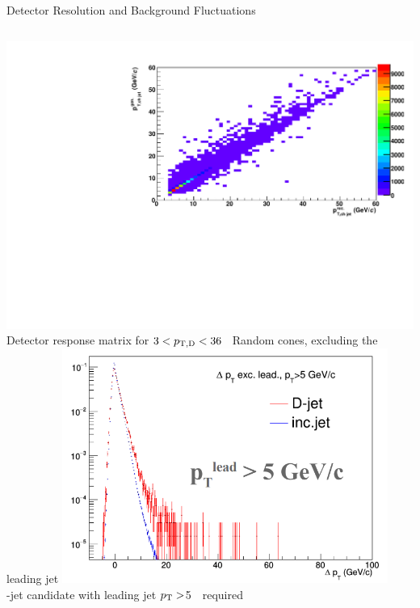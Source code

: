 \documentclass[xcolor={usenames,dvipsnames}, aspectratio=169]{beamer}
\begin{document}
\begin{frame}{Detector Resolution and Background Fluctuations}
\begin{columns}
\centering	 
\includegraphics[width=\textwidth]{img/pPb/detMatrix.pdf}\\
\small
Detector response matrix for $3<p_{\mathrm{T,D}}<36$~\GeVc
{}
Random cones, excluding the leading jet
\centering
\includegraphics[width=0.8\textwidth]{img/pPb/delta_pT.png}\\
\footnotesize
\Dzero-jet candidate with
leading jet $p_{\rm T}>$5~\GeVc\ required
\end{columns}
\end{frame}
\end{document}
